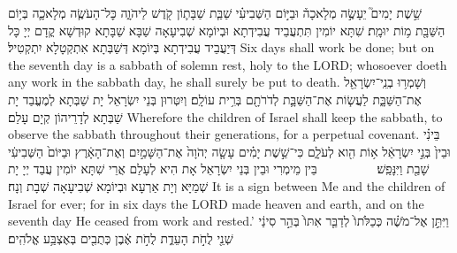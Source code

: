 {%
{שֵׁ֣שֶׁת יָמִים֮ יֵעָשֶׂ֣ה מְלָאכָה֒ וּבַיּ֣וֹם הַשְּׁבִיעִ֗י שַׁבַּ֧ת שַׁבָּת֛וֹן קֹ֖דֶשׁ לַיהֹוָ֑ה כׇּל־הָעֹשֶׂ֧ה מְלָאכָ֛ה בְּי֥וֹם הַשַּׁבָּ֖ת מ֥וֹת יוּמָֽת׃
}
{שִׁתָּא יוֹמִין תִּתְעֲבֵיד עֲבִידְתָא וּבְיוֹמָא שְׁבִיעָאָה שַׁבָּא שַׁבָּתָא קוּדְשָׁא קֳדָם יְיָ כָּל דְּיַעֲבֵיד עֲבִידְתָא בְּיוֹמָא דְּשַׁבְּתָא אִתְקְטָלָא יִתְקְטִיל׃}
{Six days shall work be done; but on the seventh day is a sabbath of solemn rest, holy to the LORD; whosoever doeth any work in the sabbath day, he shall surely be put to death.}{}
{וְשָׁמְר֥וּ בְנֵֽי־יִשְׂרָאֵ֖ל אֶת־הַשַּׁבָּ֑ת לַעֲשׂ֧וֹת אֶת־הַשַּׁבָּ֛ת לְדֹרֹתָ֖ם בְּרִ֥ית עוֹלָֽם׃}
{וְיִטְּרוּן בְּנֵי יִשְׂרָאֵל יָת שַׁבְּתָא לְמֶעֱבַד יָת שַׁבְּתָא לְדָרֵיהוֹן קְיָם עָלַם׃}
{Wherefore the children of Israel shall keep the sabbath, to observe the sabbath throughout their generations, for a perpetual covenant.}{}
{בֵּינִ֗י וּבֵין֙ בְּנֵ֣י יִשְׂרָאֵ֔ל א֥וֹת הִ֖וא לְעֹלָ֑ם כִּי־שֵׁ֣שֶׁת יָמִ֗ים עָשָׂ֤ה יְהֹוָה֙ אֶת־הַשָּׁמַ֣יִם וְאֶת־הָאָ֔רֶץ וּבַיּוֹם֙ הַשְּׁבִיעִ֔י שָׁבַ֖ת וַיִּנָּפַֽשׁ׃ \setuma         
}
{בֵּין מֵימְרִי וּבֵין בְּנֵי יִשְׂרָאֵל אָת הִיא לְעָלַם אֲרֵי שִׁתָּא יוֹמִין עֲבַד יְיָ יָת שְׁמַיָּא וְיָת אַרְעָא וּבְיוֹמָא שְׁבִיעָאָה שְׁבָת וְנָח׃}
{It is a sign between Me and the children of Israel for ever; for in six days the LORD made heaven and earth, and on the seventh day He ceased from work and rested.’}{}
{וַיִּתֵּ֣ן אֶל־מֹשֶׁ֗ה כְּכַלֹּתוֹ֙ לְדַבֵּ֤ר אִתּוֹ֙ בְּהַ֣ר סִינַ֔י שְׁנֵ֖י לֻחֹ֣ת הָעֵדֻ֑ת לֻחֹ֣ת אֶ֔בֶן כְּתֻבִ֖ים בְּאֶצְבַּ֥ע אֱלֹהִֽים׃
}}
